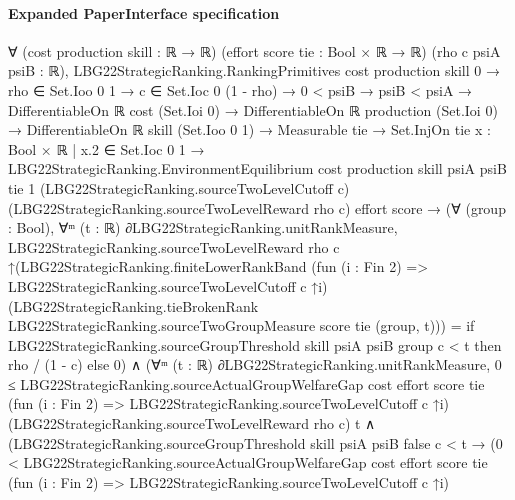 \documentclass[10pt]{article}
\begin{document}
\paragraph{Expanded PaperInterface specification}
\begin{ReviewVerbatim}
∀ (cost production skill : ℝ → ℝ) (effort score tie : Bool × ℝ → ℝ) (rho c psiA psiB : ℝ),
  LBG22StrategicRanking.RankingPrimitives cost production skill 0 →
    rho ∈ Set.Ioo 0 1 →
      c ∈ Set.Ioc 0 (1 - rho) →
        0 < psiB →
          psiB < psiA →
            DifferentiableOn ℝ cost (Set.Ioi 0) →
              DifferentiableOn ℝ production (Set.Ioi 0) →
                DifferentiableOn ℝ skill (Set.Ioo 0 1) →
                  Measurable tie →
                    Set.InjOn tie {x : Bool × ℝ | x.2 ∈ Set.Ioc 0 1} →
                      LBG22StrategicRanking.EnvironmentEquilibrium cost production skill psiA psiB tie 1
                          (LBG22StrategicRanking.sourceTwoLevelCutoff c)
                          (LBG22StrategicRanking.sourceTwoLevelReward rho c) effort score →
                        (∀ (group : Bool),
                            ∀ᵐ (t : ℝ) ∂LBG22StrategicRanking.unitRankMeasure,
                              LBG22StrategicRanking.sourceTwoLevelReward rho c
                                  ↑(LBG22StrategicRanking.finiteLowerRankBand
                                      (fun (i : Fin 2) => LBG22StrategicRanking.sourceTwoLevelCutoff c ↑i)
                                      (LBG22StrategicRanking.tieBrokenRank LBG22StrategicRanking.sourceTwoGroupMeasure
                                        score tie (group, t))) =
                                if LBG22StrategicRanking.sourceGroupThreshold skill psiA psiB group c < t then
                                  rho / (1 - c)
                                else 0) ∧
                          (∀ᵐ (t : ℝ) ∂LBG22StrategicRanking.unitRankMeasure,
                              0 ≤
                                  LBG22StrategicRanking.sourceActualGroupWelfareGap cost effort score tie
                                    (fun (i : Fin 2) => LBG22StrategicRanking.sourceTwoLevelCutoff c ↑i)
                                    (LBG22StrategicRanking.sourceTwoLevelReward rho c) t ∧
                                (LBG22StrategicRanking.sourceGroupThreshold skill psiA psiB false c < t →
                                  (0 <
                                      LBG22StrategicRanking.sourceActualGroupWelfareGap cost effort score tie
                                        (fun (i : Fin 2) => LBG22StrategicRanking.sourceTwoLevelCutoff c ↑i)

\end{ReviewVerbatim}
\end{document}
